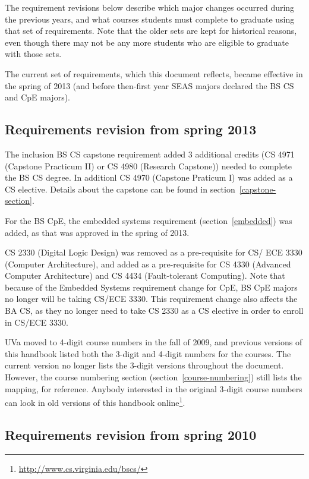 \documentclass[10pt,letter]{book}
\newcommand{\myurl}[1]{\footnote{\scriptsize\url{#1}}}
\begin{document}
The requirement revisions below describe which major changes occurred
during the previous years, and what courses students must complete to
graduate using that set of requirements. Note that the older sets are
kept for historical reasons, even though there may not be any more
students who are eligible to graduate with those sets.

The current set of requirements, which this document reflects, became
effective in the spring of 2013 (and before then-first year SEAS
majors declared the BS CS and CpE majors).

\subsection{Requirements revision from spring 2013}

The inclusion BS CS capstone requirement added 3 additional credits
(CS 4971 (Capstone Practicum II) or CS 4980 (Research Capstone))
needed to complete the BS CS degree.  In additionl CS 4970 (Capstone
Praticum I) was added as a CS elective.  Details about the capstone
can be found in section~\ref{capstone-section}.

For the BS CpE, the embedded systems requirement
(section~\ref{embedded}) was added, as that was approved in the spring
of 2013.

CS 2330 (Digital Logic Design) was removed as a pre-requisite for
CS/ ECE 3330 (Computer Architecture), and added as a pre-requisite for
CS 4330 (Advanced Computer Architecture) and CS 4434 (Fault-tolerant
Computing).  Note that because of the Embedded Systems requirement
change for CpE, BS CpE majors no longer will be taking CS/ECE 3330.
This requirement change also affects the BA CS, as they no longer need
to take CS 2330 as a CS elective in order to enroll in CS/ECE 3330.

UVa moved to 4-digit course numbers in the fall of 2009, and previous
versions of this handbook listed both the 3-digit and 4-digit numbers
for the courses.  The current version no longer lists the 3-digit
versions throughout the document.  However, the course numbering
section (section~\ref{course-numbering}) still lists the mapping, for
reference.  Anybody interested in the original 3-digit course numbers
can look in old versions of this handbook
online\myurl{http://www.cs.virginia.edu/bscs/}.

\subsection{Requirements revision from spring 2010}
\end{document}
